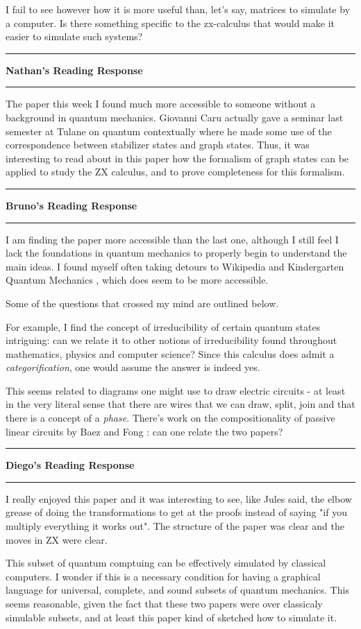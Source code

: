 \documentclass{amsart}
\newcommand{\iam}[1]{
  \vspace{0.25em}
  \hrule
  \vspace{0.25em}
  \textbf{{#1}'s Reading Response}
  \vspace{0.25em}
  \hrule
  \vspace{1em}
}
\begin{document}
I fail to see however how it is more useful than,
let's say, matrices to simulate by a computer.
Is there something specific to the zx-calculus
that would make it easier to simulate such systems?

\iam{Nathan}

The paper this week I found much more accessible to someone without a background in quantum mechanics.
Giovanni Caru actually gave a seminar last semester at Tulane on quantum contextually where he made
some use of the correspondence between stabilizer states and graph states. Thus, it was interesting
to read about in this paper how the formalism of graph states can be applied to study the ZX calculus,
and to prove completeness for this formalism.


\iam{Bruno}

I am finding the paper more accessible than the last one, although I still feel
I lack the foundations in quantum mechanics to properly begin to understand the
main ideas.
I found myself often taking detours to Wikipedia and Kindergarten Quantum
Mechanics \cite{KindergartenQuantumMechanics}, which does seem to be more
accessible.

Some of the questions that crossed my mind are outlined below.

For example, I find the concept of irreducibility of certain quantum states
intriguing: can we relate it to other notions of irreducibility found throughout
mathematics, physics and computer science? Since this calculus does admit a
\textit{categorification}, one would assume the answer is indeed yes.

This seems related to diagrams one might use to draw electric circuits - at
least in the very literal sense that there are wires that we can draw, split,
join and that there is a concept of a \textit{phase}. There's work on the
compositionality of passive linear circuits by Baez and Fong
\cite{CompositionalPassiveLinearNetworks}: can one relate the two papers?

\iam{Diego}

I really enjoyed this paper and it was interesting to see, like Jules said, the elbow grease
of doing the transformations to get at the proofs instead of saying "if you multiply everything
it works out". The structure of the paper was clear and the moves in ZX were clear.

This subset of quantum comptuing can be effectively simulated by classical computers.
I wonder if this is a necessary condition for having a graphical language for
universal, complete, and sound subsets of quantum mechanics.
This seems reasonable, given the fact that these two papers were over classicaly simulable subsets,
and at least this paper kind of sketched how to simulate it.
\end{document}
